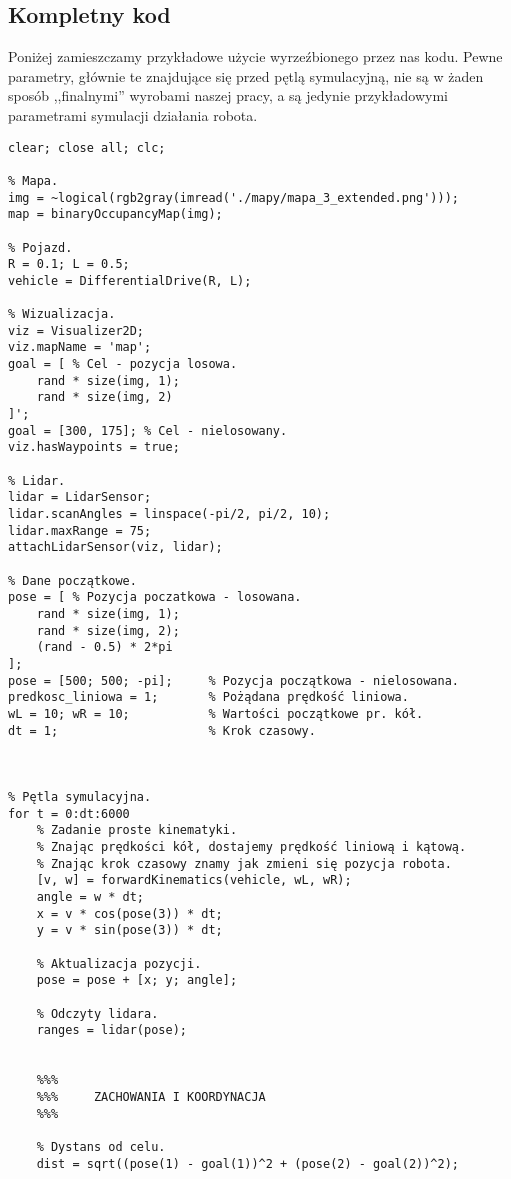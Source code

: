 \documentclass[11pt]{article}
\begin{document}
\begin{appendices}
\section{Kompletny kod}
\label{sec:kod}

Poniżej zamieszczamy przykładowe użycie wyrzeźbionego przez nas kodu. Pewne parametry, głównie te znajdujące się przed pętlą symulacyjną, nie są w żaden sposób ,,finalnymi'' wyrobami naszej pracy, a są jedynie przykładowymi parametrami symulacji działania robota.

\begin{lstlisting}
clear; close all; clc;

% Mapa.
img = ~logical(rgb2gray(imread('./mapy/mapa_3_extended.png')));
map = binaryOccupancyMap(img);

% Pojazd.
R = 0.1; L = 0.5;
vehicle = DifferentialDrive(R, L);

% Wizualizacja.
viz = Visualizer2D;
viz.mapName = 'map';
goal = [ % Cel - pozycja losowa.
    rand * size(img, 1);
    rand * size(img, 2)
]';
goal = [300, 175]; % Cel - nielosowany.
viz.hasWaypoints = true;

% Lidar.
lidar = LidarSensor;
lidar.scanAngles = linspace(-pi/2, pi/2, 10);
lidar.maxRange = 75;
attachLidarSensor(viz, lidar);

% Dane początkowe.
pose = [ % Pozycja poczatkowa - losowana.
    rand * size(img, 1);
    rand * size(img, 2);
    (rand - 0.5) * 2*pi
];
pose = [500; 500; -pi];     % Pozycja początkowa - nielosowana.
predkosc_liniowa = 1;       % Pożądana prędkość liniowa.
wL = 10; wR = 10;           % Wartości początkowe pr. kół.
dt = 1;                     % Krok czasowy.



% Pętla symulacyjna.
for t = 0:dt:6000
    % Zadanie proste kinematyki.
    % Znając prędkości kół, dostajemy prędkość liniową i kątową.
    % Znając krok czasowy znamy jak zmieni się pozycja robota.
    [v, w] = forwardKinematics(vehicle, wL, wR);
    angle = w * dt;
    x = v * cos(pose(3)) * dt;
    y = v * sin(pose(3)) * dt;
    
    % Aktualizacja pozycji.
    pose = pose + [x; y; angle];
    
    % Odczyty lidara.
    ranges = lidar(pose);

    
    %%%
    %%%     ZACHOWANIA I KOORDYNACJA
    %%%
        
    % Dystans od celu.
    dist = sqrt((pose(1) - goal(1))^2 + (pose(2) - goal(2))^2);
        

\end{lstlisting}
\end{appendices}
\end{document}
